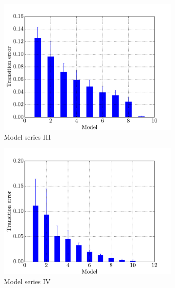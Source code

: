 \begin{figure}[p]
    \centering
    \begin{subfigure}{0.48\textwidth}
    	\centering
        \includegraphics[width=\textwidth]{results/mc3_performance_distances}
        \caption{Model series III}
        \label{fig:mc3-performance-distance}
    \end{subfigure}
    \hfill
    \begin{subfigure}{0.48\textwidth}
    	\centering
        \includegraphics[width=\textwidth]{results/mc4_performance_distances}
        \caption{Model series IV}
        \label{fig:mc4-performance-distance}
    \end{subfigure}
    \begin{subfigure}{0.48\textwidth}

\end{subfigure}
\end{figure}
